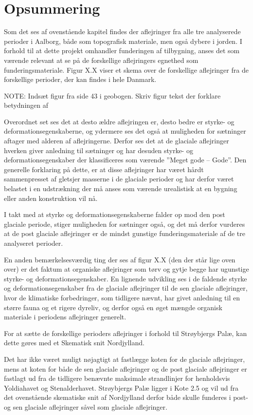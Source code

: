 \section{Opsummering}

Som det ses af ovenstående kapitel findes der aflejringer fra alle tre analyserede perioder i Aalborg, både som topografisk materiale, men også dybere i jorden. I forhold til at dette projekt omhandler funderingen af tilbygning, anses det som værende relevant at se på de forskellige aflejringers egnethed som funderingsmateriale. 
Figur X.X viser et skema over de forskellige aflejringer fra de forskellige perioder, der kan findes i hele Danmark. 

NOTE: Indsæt figur fra side 43 i geobogen. Skriv figur tekst der forklare betydningen af 

Overordnet set ses det at desto ældre aflejringen er, desto bedre er styrke- og deformationsegenskaberne, og ydermere ses det også at muligheden for sætninger aftager med alderen af aflejringerne. 
Derfor ses det at de glaciale aflejringer hverken giver anledning til sætninger og har desuden styrke- og deformationsegenskaber der klassificeres som værende ”Meget gode – Gode”. Den generelle forklaring på dette, er at disse aflejringer har været hårdt sammenpresset af gletsjer masserne i de glaciale perioder og har derfor været belastet i en udstrækning der må anses som værende urealistisk at en bygning eller anden konstruktion vil nå. 

I takt med at styrke og deformationsegenskaberne falder op mod den post glaciale periode, stiger muligheden for sætninger også, og det må derfor vurderes at de post glaciale aflejringer er de mindst gunstige funderingsmateriale af de tre analyseret perioder. 

En anden bemærkelsesværdig ting der ses af figur X.X (den der står lige oven over) er det faktum at organiske aflejringer som tørv og gytje begge har ugunstige styrke- og deformationsegenskaber. En lignende udvikling ses i de faldende styrke og deformationsegenskaber fra de glaciale aflejringer til de sen glaciale aflejringer, hvor de klimatiske forbedringer, som tidligere nævnt, har givet anledning til en større fauna og et rigere dyreliv, og derfor også en øget mængde organisk materiale i periodens aflejringer generelt. 

For at sætte de forskellige perioders aflejringer i forhold til Strøybjergs Palæ, kan dette gøres med et Skematisk snit Nordjylland.


Det har ikke været muligt nøjagtigt at fastlægge koten for de glaciale aflejringer, mens at koten for både de sen glaciale aflejringer og de post glaciale aflejringer er fastlagt ud fra de tidligere benævnte maksimale strandlinjer for henholdsvis Yoldiahavet og Stenalderhavet. 
Strøybjergs Palæ ligger i Kote 2.5 og vil ud fra det ovenstående skematiske snit af Nordjylland derfor både skulle funderes i post- og sen glaciale aflejringer såvel som glaciale aflejringer. 

